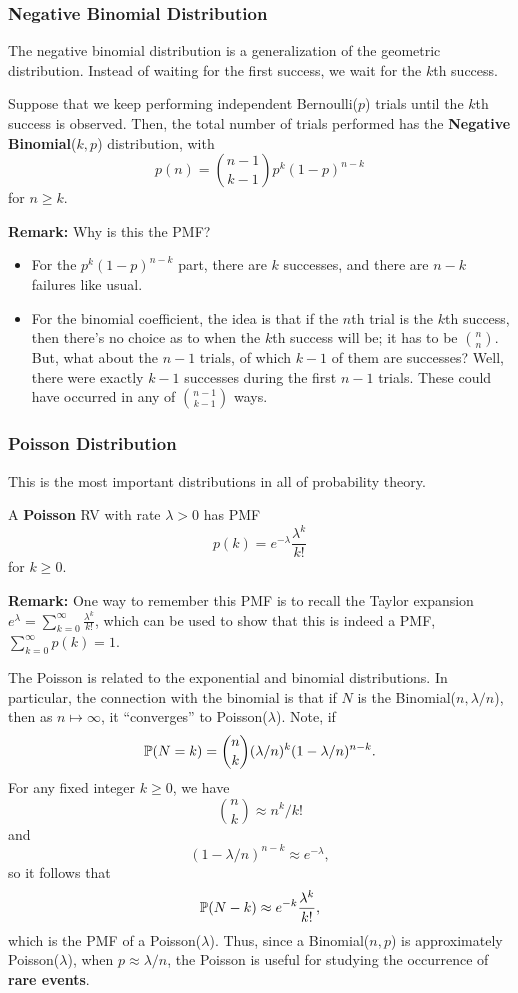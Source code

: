 \documentclass[letterpaper]{article}
\begin{document}
\subsubsection{Negative Binomial Distribution}
The negative binomial distribution is a generalization of the geometric distribution. Instead of waiting for the first success, we wait for the $k$th success. 
\begin{definition}{}{}
    Suppose that we keep performing independent Bernoulli($p$) trials until the $k$th success is observed. Then, the total number of trials performed has the \textbf{Negative Binomial}($k, p$) distribution, with 
    \[p(n) = \binom{n - 1}{k - 1} p^k (1 - p)^{n - k}\]
    for $n \geq k$. 
\end{definition}
\textbf{Remark:} Why is this the PMF? 
\begin{itemize}
    \item For the $p^k (1 - p)^{n - k}$ part, there are $k$ successes, and there are $n - k$ failures like usual. 
    \item For the binomial coefficient, the idea is that if the $n$th trial is the $k$th success, then there's no choice as to when the $k$th success will be; it has to be $\binom{n}{n}$. But, what about the $n - 1$ trials, of which $k - 1$ of them are successes? Well, there were exactly $k - 1$ successes during the first $n - 1$ trials. These could have occurred in any of $\binom{n - 1}{k - 1}$ ways. 
\end{itemize}

\subsubsection{Poisson Distribution}
This is the most important distributions in all of probability theory. 
\begin{definition}{}{}
    A \textbf{Poisson} RV with rate $\lambda > 0$ has PMF 
    \[p(k) = e^{-\lambda} \frac{\lambda^k}{k!}\]
    for $k \geq 0$. 
\end{definition}
\textbf{Remark:} One way to remember this PMF is to recall the Taylor expansion $e^{\lambda} = \sum_{k = 0}^{\infty} \frac{\lambda^k}{k!}$, which can be used to show that this is indeed a PMF, $\sum_{k = 0}^{\infty} p(k) = 1$.

\bigskip 

The Poisson is related to the exponential and binomial distributions. In particular, the connection with the binomial is that if $N$ is the Binomial($n, \lambda / n$), then as $n \mapsto \infty$, it ``converges'' to Poisson($\lambda$). Note, if 
\[\mathbb{P}(N = k) = \binom{n}{k} (\lambda / n)^k (1 - \lambda / n)^{n - k}.\]
For any fixed integer $k \geq 0$, we have 
\[\binom{n}{k} \approx n^k / k!\]
and 
\[(1 - \lambda / n)^{n - k} \approx e^{-\lambda},\]
so it follows that 
\[\mathbb{P}(N - k) \approx e^{-k} \frac{\lambda^k}{k!},\]
which is the PMF of a Poisson($\lambda$). Thus, since a Binomial($n, p$) is approximately Poisson($\lambda$), when $p \approx \lambda / n$, the Poisson is useful for studying the occurrence of \textbf{rare events}. 
\end{document}
